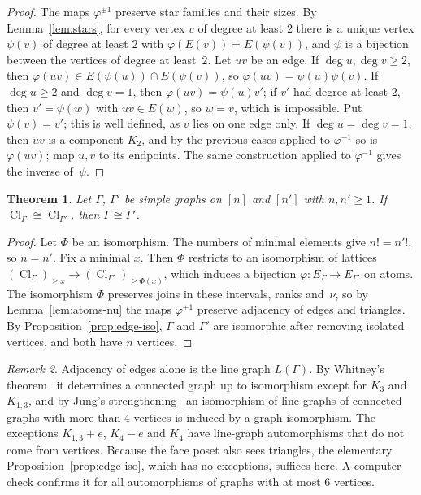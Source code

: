 \documentclass[11pt,a4paper]{article}
\numberwithin{equation}{section}
\theoremstyle{plain}
\newtheorem{theorem}{Theorem}[section]
\theoremstyle{definition}
\theoremstyle{remark}
\newtheorem{remark}[theorem]{Remark}
\DeclareMathOperator{\Cl}{Cl}
\begin{document}
\begin{proof}
The maps $\varphi^{\pm1}$ preserve star families and their sizes. By Lemma~\ref{lem:stars}, for every vertex $v$ of degree at least $2$ there is a unique vertex $\psi(v)$ of degree at least $2$ with $\varphi(E(v))=E(\psi(v))$, and $\psi$ is a bijection between the vertices of degree at least~$2$. Let $uv$ be an edge. If $\deg u,\deg v\geqslant2$, then $\varphi(uv)\in E(\psi(u))\cap E(\psi(v))$, so $\varphi(uv)=\psi(u)\psi(v)$. If $\deg u\geqslant2$ and $\deg v=1$, then $\varphi(uv)=\psi(u)v'$; if $v'$ had degree at least $2$, then $v'=\psi(w)$ with $uv\in E(w)$, so $w=v$, which is impossible. Put $\psi(v)=v'$; this is well defined, as $v$ lies on one edge only. If $\deg u=\deg v=1$, then $uv$ is a component $K_2$, and by the previous cases applied to $\varphi^{-1}$ so is $\varphi(uv)$; map $u,v$ to its endpoints. The same construction applied to $\varphi^{-1}$ gives the inverse of~$\psi$.
\end{proof}

\begin{theorem}\label{thm:cl-rigid}
Let $\Gamma$, $\Gamma'$ be simple graphs on $[n]$ and $[n']$ with $n,n'\geqslant1$. If $\Cl_\Gamma\cong\Cl_{\Gamma'}$, then $\Gamma\cong\Gamma'$.
\end{theorem}

\begin{proof}
Let $\Phi$ be an isomorphism. The numbers of minimal elements give $n!=n'!$, so $n=n'$. Fix a minimal $x$. Then $\Phi$ restricts to an isomorphism of lattices $(\Cl_\Gamma)_{\geqslant x}\to(\Cl_{\Gamma'})_{\geqslant\Phi(x)}$, which induces a bijection $\varphi\colon E_\Gamma\to E_{\Gamma'}$ on atoms. The isomorphism $\Phi$ preserves joins in these intervals, ranks and~$\nu$, so by Lemma~\ref{lem:atoms-nu} the maps $\varphi^{\pm1}$ preserve adjacency of edges and triangles. By Proposition~\ref{prop:edge-iso}, $\Gamma$ and $\Gamma'$ are isomorphic after removing isolated vertices, and both have $n$ vertices.
\end{proof}

\begin{remark}
Adjacency of edges alone is the line graph $L(\Gamma)$. By Whitney's theorem~\cite{Whi32} it determines a connected graph up to isomorphism except for $K_3$ and $K_{1,3}$, and by Jung's strengthening~\cite{Jun66} an isomorphism of line graphs of connected graphs with more than $4$ vertices is induced by a graph isomorphism. The exceptions $K_{1,3}+e$, $K_4-e$ and $K_4$ have line-graph automorphisms that do not come from vertices. Because the face poset also sees triangles, the elementary Proposition~\ref{prop:edge-iso}, which has no exceptions, suffices here. A computer check confirms it for all automorphisms of graphs with at most $6$ vertices.
\end{remark}
\end{document}
